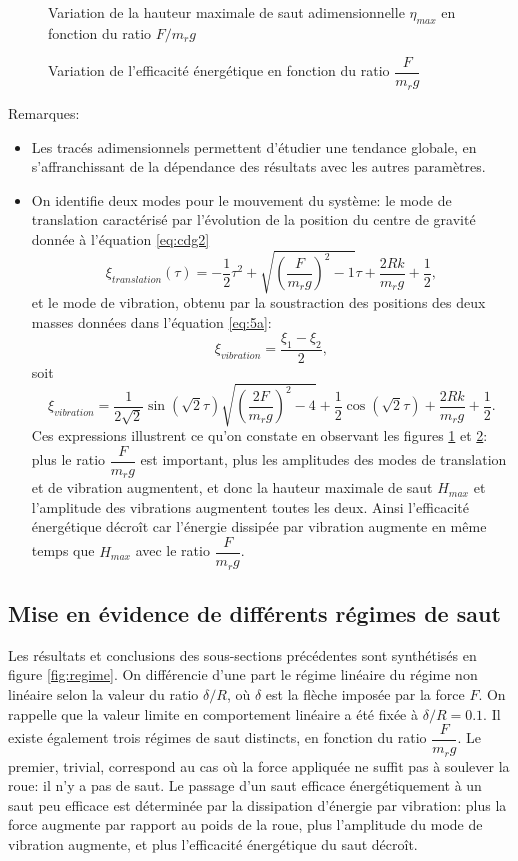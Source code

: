 \begin{figure}[htb]
\centering
\def\svgwidth{320}

\caption{Variation de la hauteur maximale de saut adimensionnelle $\eta_{max}$ en fonction du ratio $F/m_r g$}
\label{fig:eta}
\end{figure}

\begin{figure}[htb]
\centering
\def\svgwidth{320}

\caption{Variation de l'efficacité énergétique en fonction du ratio $\dfrac{F}{m_r g}$}
\label{fig:effe}
\end{figure}

Remarques:

\begin{itemize}
    \item Les tracés adimensionnels permettent d'étudier une tendance globale, en s'affranchissant de la dépendance des résultats avec les autres paramètres.
    \item On identifie deux modes pour le mouvement du système: le mode de translation caractérisé par l'évolution de la position du centre de gravité donnée à l'équation \ref{eq:cdg2}
    $$\xi_{translation}(\tau)=-\frac{1}{2}\tau^2+\sqrt{(\frac{F}{m_r g})^2-1}\tau+\frac{2Rk}{m_r g}+\frac{1}{2},$$ et le mode de vibration, obtenu par la soustraction des positions des deux masses données dans l'équation \ref{eq:5a}: 
    $$\xi_{vibration}=\frac{\xi_1 - \xi_2}{2},$$ soit $$\xi_{vibration}=\frac{1}{2\sqrt{2}}\sin{(\sqrt{2}\tau)}\sqrt{(\frac{2F}{m_r g})^2-4}+\frac{1}{2}\cos{(\sqrt{2}\tau)}+\frac{2Rk}{m_r g}+\frac{1}{2}.$$
    Ces expressions illustrent ce qu'on constate en observant les figures \ref{fig:eta} et \ref{fig:effe}: plus le ratio $\dfrac{F}{m_r g}$ est important, plus les amplitudes des modes de translation et de vibration augmentent, et donc la hauteur maximale de saut $H_{max}$ et l'amplitude des vibrations augmentent toutes les deux. Ainsi l'efficacité énergétique décroît car l'énergie dissipée par vibration augmente en même temps que $H_{max}$ avec le ratio $\dfrac{F}{m_r g}$.
\end{itemize}

\subsection{Mise en évidence de différents régimes de saut}
Les résultats et conclusions des sous-sections précédentes sont synthétisés en figure \ref{fig:regime}. On différencie d'une part le régime linéaire du régime non linéaire selon la valeur du ratio $\delta/R$, où $\delta$ est la flèche imposée par la force $F$. On rappelle que la valeur limite en comportement linéaire a été fixée à $\delta/R=0.1$. Il existe également trois régimes de saut distincts, en fonction du ratio $\dfrac{F}{m_r g}$. Le premier, trivial, correspond au cas où la force appliquée ne suffit pas à soulever la roue: il n'y a pas de saut. Le passage d'un saut efficace énergétiquement à un saut peu efficace est déterminée par la dissipation d'énergie par vibration: plus la force augmente par rapport au poids de la roue, plus l'amplitude du mode de vibration augmente, et plus l'efficacité énergétique du saut décroît.


